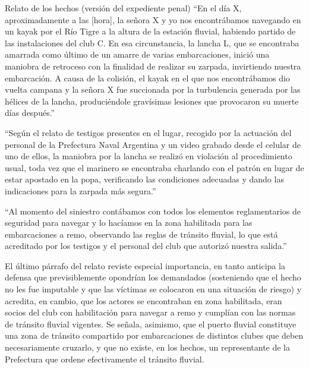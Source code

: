 \documentclass[12pt,oneside]{book}
\begin{document}
\begin{example}{Relato de los hechos (versión del expediente penal)}
``En el día X, aproximadamente a las [hora], la señora X y yo nos encontrábamos navegando en un kayak por el Río Tigre a la altura de la estación fluvial, habiendo partido de las instalaciones del club C. En esa circunstancia, la lancha L, que se encontraba amarrada como último de un amarre de varias embarcaciones, inició una maniobra de retroceso con la finalidad de realizar su zarpada, invirtiendo nuestra embarcación. A causa de la colisión, el kayak en el que nos encontrábamos dio vuelta campana y la señora X fue succionada por la turbulencia generada por las hélices de la lancha, produciéndole gravísimas lesiones que provocaron su muerte días después.''

``Según el relato de testigos presentes en el lugar, recogido por la actuación del personal de la Prefectura Naval Argentina y un video grabado desde el celular de uno de ellos, la maniobra por la lancha se realizó en violación al procedimiento usual, toda vez que el marinero se encontraba charlando con el patrón en lugar de estar apostado en la popa, verificando las condiciones adecuadas y dando las indicaciones para la zarpada más segura.''

``Al momento del siniestro contábamos con todos los elementos reglamentarios de seguridad para navegar y lo hacíamos en la zona habilitada para las embarcaciones a remo, observando las reglas de tránsito fluvial, lo que está acreditado por los testigos y el personal del club que autorizó nuestra salida.''
\end{example}


El último párrafo del relato reviste especial importancia, en tanto anticipa la defensa que previsiblemente opondrían los demandados (sosteniendo que el hecho no les fue imputable y que las víctimas se colocaron en una situación de riesgo) y acredita, en cambio, que los actores se encontraban en zona habilitada, eran socios del club con habilitación para navegar a remo y cumplían con las normas de tránsito fluvial vigentes. Se señala, asimismo, que el puerto fluvial constituye una zona de tránsito compartido por embarcaciones de distintos clubes que deben necesariamente cruzarlo, y que no existe, en los hechos, un representante de la Prefectura que ordene efectivamente el tránsito fluvial.
\end{document}
